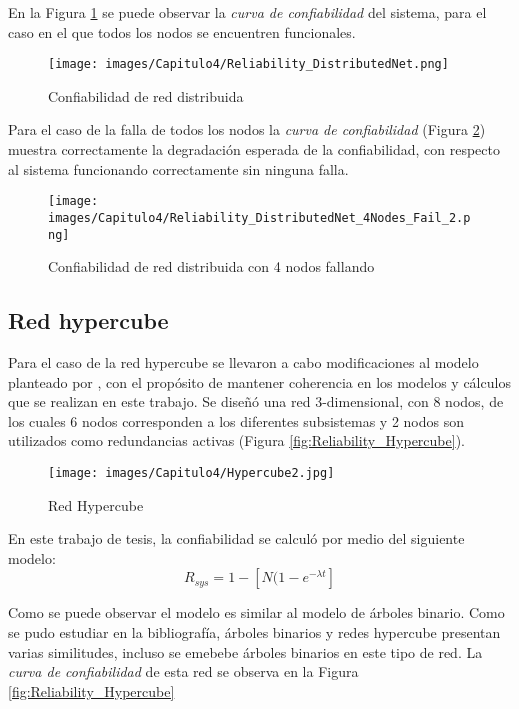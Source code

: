 En la Figura \ref{fig:reliability_distributedNet} se puede observar la \textit{curva de confiabilidad} del sistema, para el caso en el que todos los nodos se encuentren funcionales.

\begin{figure}[H]
 \centering
 \texttt{[image: images/Capitulo4/Reliability\_DistributedNet.png]}
  \caption{Confiabilidad de red distribuida}
\label{fig:reliability_distributedNet}
\end{figure}


Para el caso de la falla de todos los nodos la \textit{curva de confiabilidad} (Figura \ref{fig:reliability_distributedNet_4Nodes_Fail}) muestra correctamente la degradación esperada de la confiabilidad, con respecto al sistema funcionando correctamente sin ninguna falla.

\begin{figure}[H]
 \centering
 \texttt{[image: images/Capitulo4/Reliability\_DistributedNet\_4Nodes\_Fail\_2.png]}
  \caption{Confiabilidad de red distribuida con 4 nodos fallando}
\label{fig:reliability_distributedNet_4Nodes_Fail}
\end{figure}

\subsection{Red hypercube}
Para el caso de la red hypercube se llevaron a cabo modificaciones al modelo planteado por \cite{Mostafa14}, con el propósito de mantener coherencia en los modelos y cálculos que se realizan en este trabajo. Se diseñó una red 3-dimensional, con 8 nodos,  de los cuales 6 nodos corresponden a los diferentes subsistemas y 2 nodos son utilizados como redundancias activas (Figura \ref{fig:Reliability_Hypercube}).

\begin{figure}[H]
 \centering
 \texttt{[image: images/Capitulo4/Hypercube2.jpg]}
  \caption{Red Hypercube}
\label{fig:Hypercube}
\end{figure}

En este trabajo de tesis, la confiabilidad se calculó por medio del siguiente modelo: $$R_{sys} = 1- [N (1 - e^{- \lambda t}]$$

Como se puede observar el modelo es similar al modelo de árboles binario. Como se pudo estudiar en la bibliografía, árboles binarios y redes hypercube presentan varias similitudes, incluso se emebebe árboles binarios en este tipo de red. La \textit{curva de confiabilidad} de esta red se observa en la Figura \ref{fig:Reliability_Hypercube}


